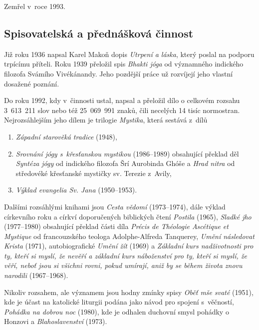 Zemřel v~roce 1993.

\subsection{Spisovatelská a přednášková činnost}

Již roku 1936 napsal Karel Makoň dopis {\em Utrpení a láska}, který poslal na
podporu trpícímu příteli. Roku 1939 přeložil spis {\em Bhakti
jóga}\cite{vivekananda2003bhakti} od významného indického filozofa Svámího  Vivékánandy.
Jeho pozdější práce už rozvíjejí jeho vlastní dosažené poznání.

Do roku 1992, kdy v~činnosti ustal, napsal a přeložil dílo o celkovém rozsahu
3~613~211 slov nebo též 25~069~991 znaků, čili necelých 14 tisíc normostran.
Nejrozsáhlejším jeho dílem je trilogie {\em Mystika}, která sestává z~dílů
\begin{enumerate}
\item{{\em Západní starověká tradice}  (1948),}
\item{
    {\em Srovnání jógy s~křesťanskou mystikou}
    (1986--1989) obsahující překlad děl
    {\em Syntéza jógy}\cite{aurobindo1999synthesis} od indického filozofa Šrí
    Aurobinda Ghóše
    a {\em Hrad nitra}\cite{teresa1588castillo} od středovéké křesťanské
    mystičky sv. Terezie z~Avily,
}
    \item{{\em Výklad evangelia Sv. Jana} (1950--1953).}
\end{enumerate}

Dalšími rozsáhlými knihami jsou {\em Cesta vědomí} (1973--1974),
dále výklad církevního roku a církví doporučených biblických čtení
{\em Postila} (1965),
{\em Sladké jho} (1977--1980) obsahující překlad části díla
{\em Précis de Théologie Ascétique et Mystique}\cite{tanquerey1928precis}
od francouzského teologa Adolphe-Alfreda Tanquerey,
{\em Umění následovat Krista} (1971),
autobiografické {\em Umění žít} (1969)
a {\em Základní kurs nadživotnosti pro ty, kteří si myslí, že nevěří a základní
kurs náboženství pro ty, kteří si myslí, že věří, neboť jsou si všichni rovni,
pokud umírají, aniž by se během života znovu narodili} (1967--1968).

Nikoliv rozsahem, ale významem jsou hodny zmínky spisy
{\em Oběť mše svaté} (1951), kde je účast na katolické liturgii podána jako
návod pro spojení s~věčností,
{\em Pohádka na dobrou noc} (1980), kde je odhalen duchovní smysl pohádky o
Honzovi
a {\em Blahoslavenství} (1973).

